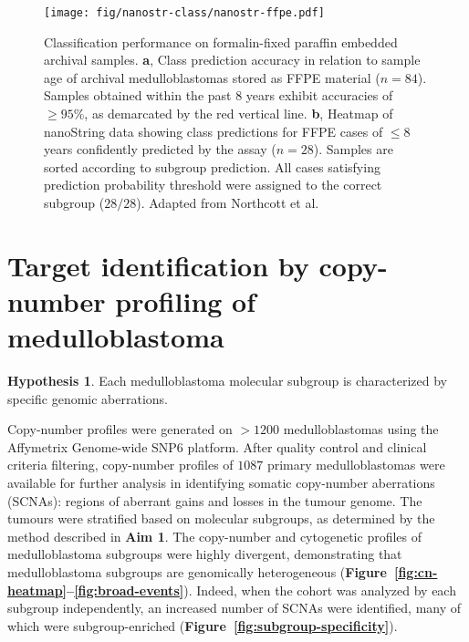 \documentclass[11pt,letterpaper]{article}
\theoremstyle{definition}
\newtheorem*{hypothesis}{Hypothesis}
\begin{document}
\begin{figure}[h]
	\begin{center}
		\texttt{[image: fig/nanostr-class/nanostr-ffpe.pdf]}
	\end{center}
	\caption[Classification performance on formalin-fixed paraffin embedded archival samples]
	{
	Classification performance on formalin-fixed paraffin embedded archival samples.
	\textbf{a}, Class prediction accuracy in relation to sample age of archival medulloblastomas stored as FFPE material ($n = 84$). Samples obtained within the past 8 years exhibit accuracies of $\geq 95\%$, as demarcated by the red vertical line.
	\textbf{b}, Heatmap of nanoString data showing class predictions for FFPE cases of $\leq 8$ years confidently predicted by the assay ($n = 28$). Samples are sorted according to subgroup prediction. All cases satisfying prediction probability threshold were assigned to the correct subgroup ($28/28$). Adapted from Northcott et al.
	}
	\label{fig:nanostr-ffpe}
\end{figure}

\clearpage

\section{Target identification by copy-number profiling of medulloblastoma}

\begin{hypothesis}
Each medulloblastoma molecular subgroup is characterized by specific genomic aberrations.
\end{hypothesis}

Copy-number profiles were generated on $> 1200$ medulloblastomas using the Affymetrix Genome-wide SNP6 platform. After quality control and clinical criteria filtering, copy-number profiles of $1087$ primary medulloblastomas were available for further analysis in identifying somatic copy-number aberrations (SCNAs): regions of aberrant gains and losses in the tumour genome. The tumours were stratified based on molecular subgroups, as determined by the method described in \textbf{Aim 1}. The copy-number and cytogenetic profiles of medulloblastoma subgroups were highly divergent, demonstrating that medulloblastoma subgroups are genomically heterogeneous (\textbf{Figure~\ref{fig:cn-heatmap}--\ref{fig:broad-events}}). Indeed, when the cohort was analyzed by each subgroup independently, an increased number of SCNAs were identified, many of which were subgroup-enriched (\textbf{Figure~\ref{fig:subgroup-specificity}}).
\end{document}
